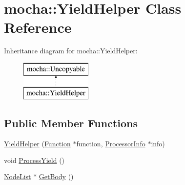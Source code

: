 \hypertarget{classmocha_1_1_yield_helper}{
\section{mocha::YieldHelper Class Reference}
\label{classmocha_1_1_yield_helper}
}
Inheritance diagram for mocha::YieldHelper:\begin{figure}[H]
\begin{center}
\leavevmode
\includegraphics[height=2.000000cm]{classmocha_1_1_yield_helper}
\end{center}
\end{figure}
\subsection*{Public Member Functions}
\begin{DoxyCompactItemize}
\item 
\hyperlink{classmocha_1_1_yield_helper_a1441934bae98465cb822407d90617639}{YieldHelper} (\hyperlink{classmocha_1_1_function}{Function} $\ast$function, \hyperlink{classmocha_1_1_processor_info}{ProcessorInfo} $\ast$info)
\item 
void \hyperlink{classmocha_1_1_yield_helper_ae2ef758e99752f0dbc30b0690fdde8f7}{ProcessYield} ()
\item 
\hyperlink{classmocha_1_1_node_list}{NodeList} $\ast$ \hyperlink{classmocha_1_1_yield_helper_a8cb862c2afb9b683129c0759301ef49d}{GetBody} ()
\end{DoxyCompactItemize}
